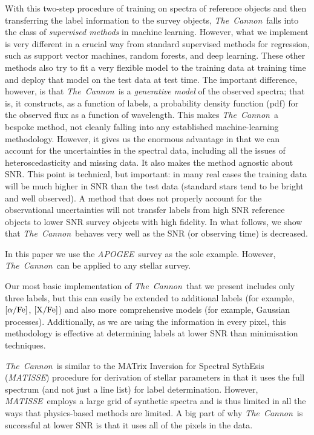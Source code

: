 \documentclass[12pt, preprint]{aastex}
\newcommand{\tc}{\textsl{The~Cannon}}
\newcommand{\apogee}{\textsl{APOGEE}}
\newcommand{\matisse}{\textsl{MATISSE}}
\newcommand{\xfe}{\mbox{$\rm [X/Fe]$}}
\newcommand{\alphafe}{\mbox{$\rm [\alpha/Fe]$}}
\begin{document}
With this two-step procedure of training on spectra of reference objects and then transferring the label information to the survey objects, \tc\ falls into the class of \emph{supervised methods} in machine learning. 
However, what we implement is very different in a crucial way from standard supervised methods for regression, such as support vector machines, random forests, and deep learning.
These other methods also try to fit a very flexible model to the training data at training time
and deploy that model on the test data at test time.
The important difference, however, is that \tc\ is a \emph{generative model} of the observed spectra;
that is, it constructs, as a function of labels, a probability density function (pdf) for the observed
flux as a function of wavelength. 
This makes \tc\ a bespoke method, not cleanly falling into any established machine-learning methodology.
However, it gives us the enormous advantage in that we can account for the uncertainties in the spectral data,
including all the issues of heteroscedasticity and missing data.
It also makes the method agnostic about SNR.
This point is technical, but important: in many real cases the training data will be much higher in SNR than the test data
(standard stars tend to be bright and well observed).
A method that does not properly account for the observational uncertainties will not transfer labels from high SNR reference objects to lower SNR survey objects with high fidelity.
In what follows, we show that \tc\ behaves very well as the SNR (or observing time) is decreased.

In this paper we use the \apogee\ survey as the sole example. 
However, \tc\ can be applied to any stellar survey.  

Our most basic implementation of \tc\ that we present includes only three labels, but this can easily be extended to additional labels  (for example, \alphafe, \xfe) and also more comprehensive models (for example, Gaussian processes). 
Additionally, as we are using the information in every pixel, this methodology is effective at determining labels at lower SNR than minimisation techniques.

\tc\ is similar to the MATrix Inversion for Spectral SythEsis (\matisse) procedure
for derivation of stellar parameters \citep{RB2006} in that it uses the full spectrum
(and not just a line list) for label determination.
However, \matisse\ employs a large grid of synthetic spectra
and is thus limited in all the ways that physics-based methods are limited.
A big part of why \tc\ is successful at lower SNR
is that it uses all of the pixels in the data.
\end{document}
